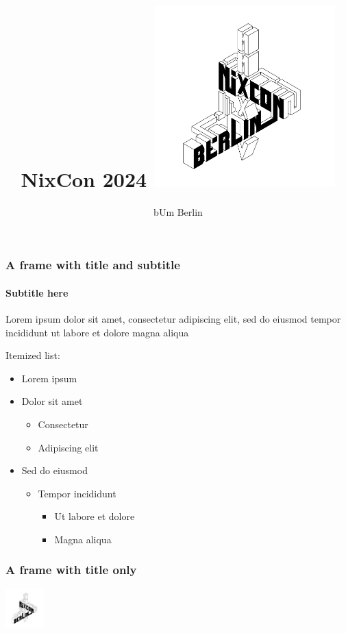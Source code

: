 \documentclass{beamer}
\title{NixCon 2024 \quad \includegraphics[height=7cm]{nixcon-2024-logo-inkscape3.png}}
\subtitle{bUm Berlin}
\date{\formatdate{25}{10}{2024}}
\begin{document}
\frame[plain]{\titlepage}

\begin{frame}
  \frametitle{A frame with title and subtitle}
  \framesubtitle{Subtitle here}
  Lorem ipsum dolor sit amet, consectetur adipiscing elit, sed do eiusmod tempor incididunt ut labore et dolore magna aliqua \par
  Itemized list:
  \begin{itemize}
  \item Lorem ipsum
  \item Dolor sit amet
    \begin{itemize}
    \item Consectetur
    \item Adipiscing elit
    \end{itemize}
  \item Sed do eiusmod
    \begin{itemize}
    \item Tempor incididunt
      \begin{itemize}
      \item Ut labore et dolore
      \item Magna aliqua
      \end{itemize}
    \end{itemize}
  \end{itemize}
\end{frame}

\begin{frame}
  \frametitle{A frame with title only}
\includegraphics[height=1.5cm]{nixcon-2024-logo-inkscape3.png}
\end{frame}
\end{document}
